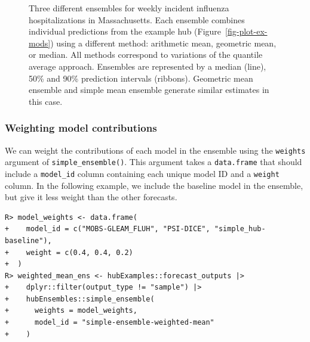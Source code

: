 \documentclass[
  article,
  shortnames,
  notitle]{jss}
\begin{document}
\begin{figure}


\caption{\label{fig-plot-ensembles}Three different ensembles for weekly
incident influenza hospitalizations in Massachusetts. Each ensemble
combines individual predictions from the example hub
(Figure~\ref{fig-plot-ex-mods}) using a different method: arithmetic
mean, geometric mean, or median. All methods correspond to variations of
the quantile average approach. Ensembles are represented by a median
(line), 50\% and 90\% prediction intervals (ribbons). Geometric mean
ensemble and simple mean ensemble generate similar estimates in this
case.}

\end{figure}%

\subsubsection{Weighting model
contributions}\label{weighting-model-contributions}

We can weight the contributions of each model in the ensemble using the
\texttt{weights} argument of \texttt{simple\_ensemble()}. This argument
takes a \texttt{data.frame} that should include a \texttt{model\_id}
column containing each unique model ID and a \texttt{weight} column. In
the following example, we include the baseline model in the ensemble,
but give it less weight than the other forecasts.

\begin{verbatim}
R> model_weights <- data.frame(
+    model_id = c("MOBS-GLEAM_FLUH", "PSI-DICE", "simple_hub-baseline"),
+    weight = c(0.4, 0.4, 0.2)
+  )
R> weighted_mean_ens <- hubExamples::forecast_outputs |>
+    dplyr::filter(output_type != "sample") |>
+    hubEnsembles::simple_ensemble(
+      weights = model_weights,
+      model_id = "simple-ensemble-weighted-mean"
+    )
\end{verbatim}
\end{document}
